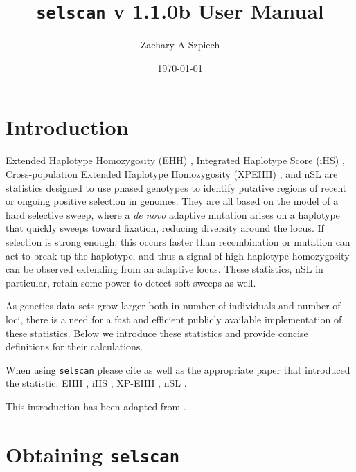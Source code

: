 \documentclass[12pt]{article}%
\title{{\tt selscan} v 1.1.0b User Manual}
\date{\today}
\author{Zachary A Szpiech}
\begin{document}
\lstset{breaklines=true,basicstyle=\ttfamily}

\null  %
\nointerlineskip  %
\vfill
\let\snewpage \newpage
\let\newpage \relax
\maketitle
\thispagestyle{empty}
\let \newpage \snewpage
\vfill 
\break %

\tableofcontents 

\newpage

\section{Introduction}

Extended Haplotype Homozygosity (EHH) \cite[]{SabetiEtAl02}, Integrated Haplotype 
Score (iHS) \cite[]{VoightEtAl06}, Cross-population Extended Haplotype 
Homozygosity (XPEHH) \cite[]{SabetiEtAl07}, and nSL \cite[]{FerrerAdmetllaEtAl14} are statistics designed to use phased genotypes to identify putative regions
of recent or ongoing positive selection in genomes.  They are all based on the model of 
a hard selective sweep, where a {\it de novo} adaptive mutation arises on a haplotype
that quickly sweeps toward fixation, reducing diversity around the locus.  If selection is strong enough, this occurs
faster than recombination or mutation can act to break up the haplotype, and thus a signal of high 
haplotype homozygosity can be observed extending from an adaptive locus.  These statistics, nSL in particular, retain some power to detect soft sweeps as well.

As genetics data sets grow larger both in number of individuals and number of loci,
there is a need for a fast and efficient publicly available implementation of these statistics. Below we 
introduce these statistics and provide concise definitions for their calculations.  

When using {\tt selscan} please cite \cite{SzpiechAndHernandez14} as well as the appropriate paper that introduced the statistic: EHH \cite[]{SabetiEtAl02}, iHS \cite[]{VoightEtAl06}, XP-EHH \cite[]{SabetiEtAl07}, nSL \cite[]{FerrerAdmetllaEtAl14}.

This introduction has been adapted from \cite{SzpiechAndHernandez14}.

\section{Obtaining {\tt selscan}}
\end{document}
